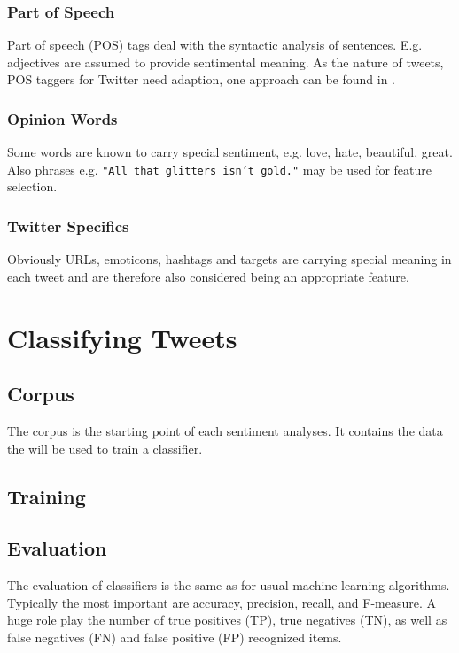 \documentclass{acm_proc_article-sp}
\begin{document}
\subsubsection{Part of Speech}
Part of speech (POS) tags deal with the syntactic analysis of sentences. E.g. adjectives are assumed to provide sentimental meaning. \cite{liu2010sentimentanalysis} As the nature of tweets, POS taggers for Twitter need adaption, one approach can be found in \cite{gimpel2011part}. 

\subsubsection{Opinion Words}
Some words are known to carry special sentiment, e.g. love, hate, beautiful, great. Also phrases e.g. \texttt{"All that glitters isn't gold."} may be used for feature selection. \cite{liu2010sentimentanalysis}

\subsubsection{Twitter Specifics}
Obviously URLs, emoticons, hashtags and targets are carrying special meaning in each tweet and are therefore also considered being an appropriate feature. \cite{gimpel2011part}

\section{Classifying Tweets} \label{classification}


\subsection{Corpus} The corpus is the starting point of each sentiment
analyses. It contains the data the will be used to train a classifier.


\subsection{Training}

\subsection{Evaluation}
The evaluation of classifiers is the same as for usual machine learning algorithms. Typically the most important are accuracy, precision, recall, and F-measure. A huge role play the number of true positives (TP), true negatives (TN), as well as false negatives (FN) and false positive (FP) recognized items. 
\cite{haddi2013therole, ting2011naive, sokolova2006beyond}
\end{document}
